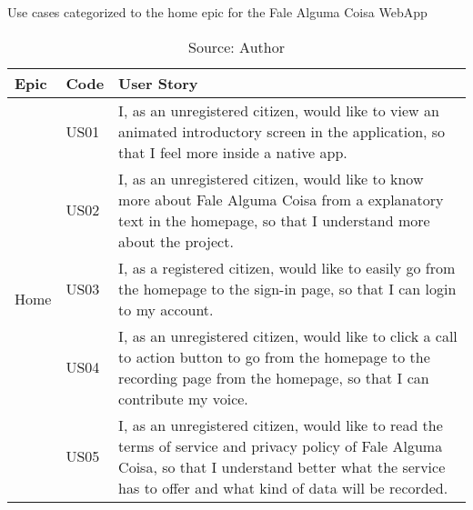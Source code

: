\begin{table}[h]
\caption{Use cases categorized to the home epic for the Fale Alguma Coisa WebApp}
\label{tab:falealgumacoisa-home-epic}
\centering
\begin{tabular}{|p{2cm}|p{1cm}|p{10cm}|}
\hline
Epic & Code & User Story \\ \hline
\multirow{5}{*}{Home} 
    & US01 & I, as an unregistered citizen, would like to view an animated introductory screen in the application, so that I feel more inside a native app. \\ \cline{2-3} 
    & US02 & I, as an unregistered citizen, would like to know more about Fale Alguma Coisa from a explanatory text in the homepage, so that I understand more about the project. \\ \cline{2-3} 
    & US03 & I, as a registered citizen, would like to easily go from the homepage to the sign-in page, so that I can login to my account. \\ \cline{2-3} 
    & US04 & I, as an unregistered citizen, would like to click a call to action button to go from the homepage to the recording page from the homepage, so that I can contribute my voice. \\ \cline{2-3} 
    & US05 & I, as an unregistered citizen, would like to read the terms of service and privacy policy of Fale Alguma Coisa, so that I understand better what the service has to offer and what kind of data will be recorded. \\ \hline
\end{tabular}
\caption*{Source: Author}
\end{table}

